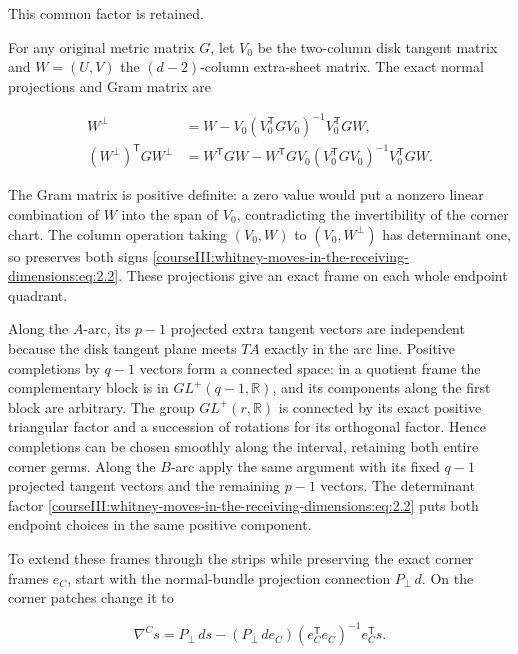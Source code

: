 This common factor is retained.

For any original metric matrix \(G\), let \(V_0\) be the two-column disk tangent matrix and \(W=(U,V)\) the \((d-2)\)-column extra-sheet matrix. The exact normal projections and Gram matrix are

\begin{equation}
\begin{aligned}
 W^\perp&=W-V_0(V_0^{\mathsf T}GV_0)^{-1}V_0^{\mathsf T}GW,\\
 (W^\perp)^{\mathsf T}GW^\perp
 &=W^{\mathsf T}GW
   -W^{\mathsf T}GV_0(V_0^{\mathsf T}GV_0)^{-1}V_0^{\mathsf T}GW .
 \end{aligned}
 \label{courseIII:whitney-moves-in-the-receiving-dimensions:eq:2.3}
\end{equation}

The Gram matrix is positive definite: a zero value would put a nonzero linear combination of \(W\) into the span of \(V_0\), contradicting the invertibility of the corner chart. The column operation taking \((V_0,W)\) to \((V_0,W^\perp)\) has determinant one, so preserves both signs \eqref{courseIII:whitney-moves-in-the-receiving-dimensions:eq:2.2}. These projections give an exact frame on each whole endpoint quadrant.

Along the \(A\)-arc, its \(p-1\) projected extra tangent vectors are independent because the disk tangent plane meets \(TA\) exactly in the arc line. Positive completions by \(q-1\) vectors form a connected space: in a quotient frame the complementary block is in \(GL^+(q-1,\mathbb R)\), and its components along the first block are arbitrary. The group \(GL^+(r,\mathbb R)\) is connected by its exact positive triangular factor and a succession of rotations for its orthogonal factor. Hence completions can be chosen smoothly along the interval, retaining both entire corner germs. Along the \(B\)-arc apply the same argument with its fixed \(q-1\) projected tangent vectors and the remaining \(p-1\) vectors. The determinant factor \eqref{courseIII:whitney-moves-in-the-receiving-dimensions:eq:2.2} puts both endpoint choices in the same positive component.

To extend these frames through the strips while preserving the exact corner frames \(e_C\), start with the normal-bundle projection connection \(P_\perp\,d\). On the corner patches change it to

\begin{equation}
\nabla^C s
 =P_\perp\,ds-
   (P_\perp\,de_C)(e_C^{\mathsf T}e_C)^{-1}e_C^{\mathsf T}s .
 \label{courseIII:whitney-moves-in-the-receiving-dimensions:eq:2.4}
\end{equation}

